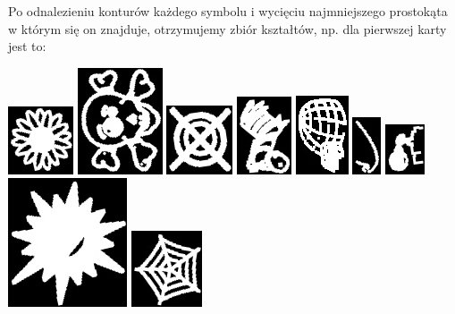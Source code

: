 \documentclass[10pt,a4paper]{article}
\begin{document}
Po odnalezieniu konturów każdego symbolu i wycięciu najmniejszego prostokąta w którym się on znajduje, otrzymujemy zbiór kształtów, np. dla pierwszej karty jest to:\\
\begin{center}
\includegraphics[scale=0.5]{2.1/sign00.jpg}
\includegraphics[scale=0.5]{2.1/sign01.jpg}
\includegraphics[scale=0.5]{2.1/sign02.jpg}
\includegraphics[scale=0.5]{2.1/sign03.jpg}
\includegraphics[scale=0.5]{2.1/sign04.jpg}
\includegraphics[scale=0.5]{2.1/sign05.jpg}
\includegraphics[scale=0.5]{2.1/sign06.jpg}
\includegraphics[scale=0.5]{2.1/sign07.jpg}
\includegraphics[scale=0.5]{2.1/sign08.jpg}
\end{center}
\end{document}

